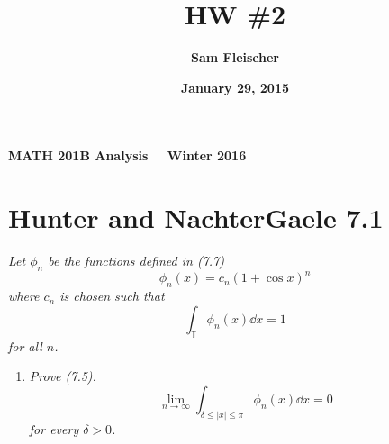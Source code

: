 \documentclass[12pt]{article}
\title{\bf HW \#2}
\author{\bf Sam Fleischer}
\date{\bf January 29, 2015}
\theoremstyle{plain}
\begin{document}
\textbf{MATH 201B \hfill Analysis \ \ \hfill Winter 2016\ \ \ }

{\let\newpage\relax\maketitle}

\section*{Hunter and NachterGaele 7.1}
\emph{Let $\phi_n$ be the functions defined in (7.7) $$\phi_n(x) = c_n(1 + \cos x)^n$$ where $c_n$ is chosen such that $$\int_\mathbb{T}\phi_n(x) \dd x = 1$$ for all $n$.}
\begin{enumerate}[\bf (a)]
    \item
        \emph{Prove (7.5).  $$\lim_{n\rightarrow \infty}\int_{\delta\leq|x|\leq \pi}\phi_n(x) \dd x = 0$$ for every $\delta > 0$.} \\


\end{enumerate}
\end{document}

